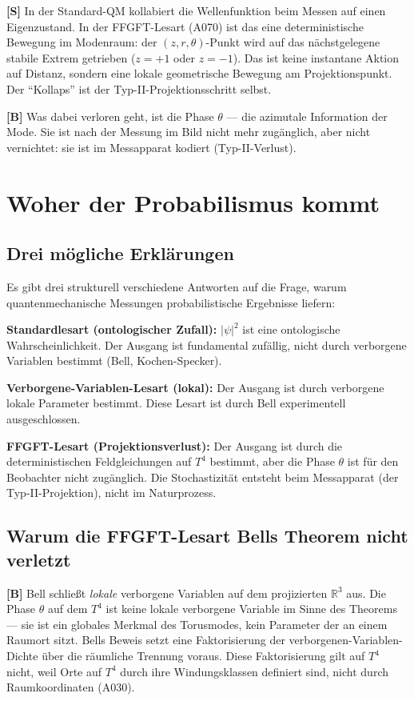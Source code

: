 \textbf{[S]} In der Standard-QM kollabiert die Wellenfunktion beim Messen
auf einen Eigenzustand. In der FFGFT-Lesart (A070) ist das eine
deterministische Bewegung im Modenraum: der $(z,r,\theta)$-Punkt wird auf
das nächstgelegene stabile Extrem getrieben ($z=+1$ oder $z=-1$). Das ist
keine instantane Aktion auf Distanz, sondern eine lokale geometrische
Bewegung am Projektionspunkt. Der \enquote{Kollaps} ist der
Typ-II-Projektionsschritt selbst.

\textbf{[B]} Was dabei verloren geht, ist die Phase $\theta$ ---
die azimutale Information der Mode. Sie ist nach der Messung im Bild
nicht mehr zugänglich, aber nicht vernichtet: sie ist im Messapparat
kodiert (Typ-II-Verlust).

\section{Woher der Probabilismus kommt}

\subsection{Drei mögliche Erklärungen}

Es gibt drei strukturell verschiedene Antworten auf die Frage, warum
quantenmechanische Messungen probabilistische Ergebnisse liefern:

\textbf{Standardlesart (ontologischer Zufall):} $|\psi|^2$ ist eine
ontologische Wahrscheinlichkeit. Der Ausgang ist fundamental zufällig,
nicht durch verborgene Variablen bestimmt (Bell, Kochen-Specker).

\textbf{Verborgene-Variablen-Lesart (lokal):} Der Ausgang ist durch
verborgene lokale Parameter bestimmt. Diese Lesart ist durch Bell
experimentell ausgeschlossen.

\textbf{FFGFT-Lesart (Projektionsverlust):} Der Ausgang ist durch
die deterministischen Feldgleichungen auf $T^4$ bestimmt, aber
die Phase $\theta$ ist für den Beobachter nicht zugänglich.
Die Stochastizität entsteht beim Messapparat (der Typ-II-Projektion),
nicht im Naturprozess.

\subsection{Warum die FFGFT-Lesart Bells Theorem nicht verletzt}

\textbf{[B]} Bell schließt \emph{lokale} verborgene Variablen auf dem
projizierten $\mathbb{R}^3$ aus. Die Phase $\theta$ auf dem $T^4$
ist keine lokale verborgene Variable im Sinne des Theorems --- sie ist
ein globales Merkmal des Torusmodes, kein Parameter der an einem
Raumort sitzt. Bells Beweis setzt eine Faktorisierung der
verborgenen-Variablen-Dichte über die räumliche Trennung voraus.
Diese Faktorisierung gilt auf $T^4$ nicht, weil Orte auf $T^4$
durch ihre Windungsklassen definiert sind, nicht durch Raumkoordinaten
(A030).

